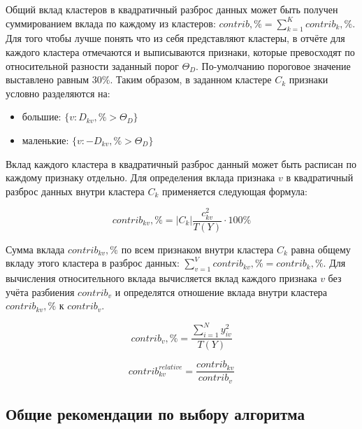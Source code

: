 \documentclass[12pt]{diploma}
\begin{document}
	Общий вклад кластеров в квадратичный разброс данных может быть получен суммированием вклада по каждому из кластеров: $ contrib,\% = \sum_{k=1}^{K} contrib_k,\% $. Для того чтобы лучше понять что из себя представляют кластеры, в отчёте для каждого кластера отмечаются и выписываются признаки, которые превосходят по относительной разности заданный порог $ \Theta_D $. 	По-умолчанию пороговое значение выставлено равным $ 30\% $. Таким образом, в заданном кластере $ C_k $ признаки условно разделяются на:
	\begin{itemize}
		\item большие: $ \{v: D_{kv},\% > \Theta_D\} $
		\item маленькие: $ \{v: -D_{kv},\% > \Theta_D\} $
	\end{itemize}

	Вклад каждого кластера в квадратичный разброс данный может быть расписан по каждому признаку отдельно. Для определения вклада признака $ v $ в квадратичный разброс данных внутри кластера $ C_k $ применяется следующая формула:
	
	\begin{equation*}
	contrib_{kv},\% = |C_k| \frac{c_{kv}^2}{T(Y)} \cdot 100\%
	\end{equation*}	
	
	Сумма вклада $ contrib_{kv},\%  $ по всем признаком внутри кластера $ C_k $ равна общему вкладу этого кластера в разброс данных: $\sum_{v=1}^{V} contrib_{kv},\%  = contrib_{k},\%  $. Для вычисления относительного вклада вычисляется вклад каждого признака $ v $ без учёта разбиения $ contrib_v $ и определятся отношение вклада внутри кластера $ contrib_{kv},\%  $  к $ contrib_v $.
	
	\vspace*{1\baselineskip} 
	\noindent\begin{minipage}{.5\linewidth}
		\begin{equation*}
		contrib_v,\% = \frac{\sum_{i=1}^{N} y_{iv}^2}{T(Y)}			
		\end{equation*}
	\end{minipage}%
	\begin{minipage}{.5\linewidth}
		\begin{equation*}
		contrib_{kv}^{relative} = \frac{contrib_{kv}}{ contrib_v}
		\end{equation*}
	\end{minipage}%
	\vspace*{1\baselineskip} 
	
	\subsection{Общие рекомендации по выбору алгоритма}
	
\end{document}
